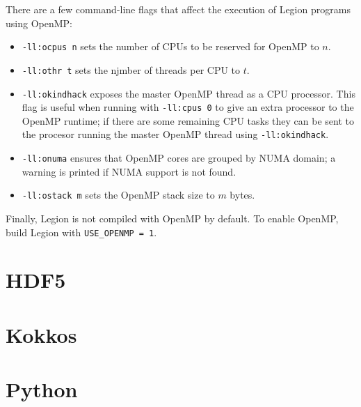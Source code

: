 There are a few command-line flags that affect the execution of Legion programs using OpenMP:
\begin{itemize}

\item {\tt -ll:ocpus n} sets the number of CPUs to be reserved for OpenMP to $n$.
\item {\tt -ll:othr t} sets the njmber of threads per CPU to $t$.
\item {\tt -ll:okindhack} exposes the master OpenMP thread as a CPU processor. This flag is useful when running with {\tt -ll:cpus 0} to give an extra processor to the OpenMP runtime; if there are some remaining CPU tasks they can be sent to the
    procesor running the master OpenMP thread using {\tt -ll:okindhack}.
\item {\tt -ll:onuma} ensures that OpenMP cores are grouped by NUMA domain; a warning is printed if NUMA support is not found.
\item {\tt -ll:ostack m} sets the OpenMP stack size to $m$ bytes.
\end{itemize}

Finally, Legion is not compiled with OpenMP by default.  To enable OpenMP, build Legion with {\tt USE\_OPENMP = 1}.
  

\section{HDF5}
\label{sechdf5}

\section{Kokkos}
\label{sec:kokkos}

\section{Python}
\label{sec:python}
